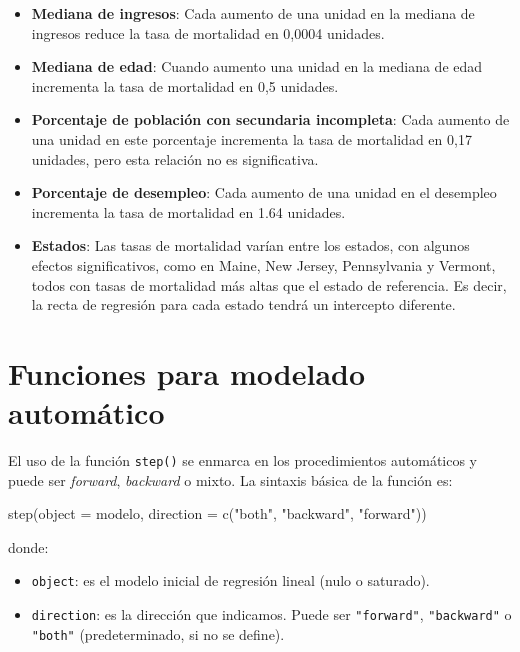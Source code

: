\documentclass[
  spanish,
  a4paper,
]{scrbook}
\newenvironment{Shaded}{\begin{snugshade}}{\end{snugshade}}
\newcommand{\AttributeTok}[1]{\textcolor[rgb]{0.40,0.45,0.13}{#1}}
\newcommand{\FunctionTok}[1]{\textcolor[rgb]{0.28,0.35,0.67}{#1}}
\newcommand{\NormalTok}[1]{\textcolor[rgb]{0.00,0.23,0.31}{#1}}
\newcommand{\StringTok}[1]{\textcolor[rgb]{0.13,0.47,0.30}{#1}}
\providecommand{\tightlist}{%
  \setlength{\itemsep}{0pt}\setlength{\parskip}{0pt}}
\begin{document}
\begin{itemize}
\item
  \textbf{Mediana de ingresos}: Cada aumento de una unidad en la mediana
  de ingresos reduce la tasa de mortalidad en 0,0004 unidades.
\item
  \textbf{Mediana de edad}: Cuando aumento una unidad en la mediana de
  edad incrementa la tasa de mortalidad en 0,5 unidades.
\item
  \textbf{Porcentaje de población con secundaria incompleta}: Cada
  aumento de una unidad en este porcentaje incrementa la tasa de
  mortalidad en 0,17 unidades, pero esta relación no es significativa.
\item
  \textbf{Porcentaje de desempleo}: Cada aumento de una unidad en el
  desempleo incrementa la tasa de mortalidad en 1.64 unidades.
\item
  \textbf{Estados}: Las tasas de mortalidad varían entre los estados,
  con algunos efectos significativos, como en Maine, New Jersey,
  Pennsylvania y Vermont, todos con tasas de mortalidad más altas que el
  estado de referencia. Es decir, la recta de regresión para cada estado
  tendrá un intercepto diferente.
\end{itemize}

\section{Funciones para modelado
automático}\label{funciones-para-modelado-automuxe1tico}

El uso de la función \texttt{step()} se enmarca en los procedimientos
automáticos y puede ser \emph{forward}, \emph{backward} o mixto. La
sintaxis básica de la función es:

\begin{Shaded}
\begin{Highlighting}[]
\FunctionTok{step}\NormalTok{(}\AttributeTok{object =}\NormalTok{ modelo, }\AttributeTok{direction =} \FunctionTok{c}\NormalTok{(}\StringTok{"both"}\NormalTok{, }\StringTok{"backward"}\NormalTok{, }\StringTok{"forward"}\NormalTok{))}
\end{Highlighting}
\end{Shaded}

donde:

\begin{itemize}
\tightlist
\item
  \texttt{object}: es el modelo inicial de regresión lineal (nulo o
  saturado).
\item
  \texttt{direction}: es la dirección que indicamos. Puede ser
  \texttt{"forward"}, \texttt{"backward"} o \texttt{"both"}
  (predeterminado, si no se define).
\end{itemize}
\end{document}
